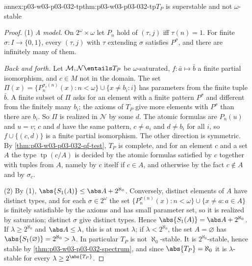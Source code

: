 \begin{annexitem}{annex:p03-w03-p03-032-tp}{thm:p03-w03-p03-032-tp}{\(T_P\) is superstable and not \(\omega\)-stable}
\begin{proof}
(1) \emph{A model.}  On \(2^\omega\times\omega\) let \(P_n\) hold of
\((\tau,j)\) iff \(\tau(n)=1\).  For finite \(\sigma:I\to\{0,1\}\), every
\((\tau,j)\) with \(\tau\) extending \(\sigma\) satisfies \(P^\sigma\), and
there are infinitely many of them.

\emph{Back and forth.}  Let \(\mathcal M,\mathcal N\entails T_P\) be
\(\omega\)-saturated, \(f:\bar a\mapsto\bar b\) a finite partial isomorphism,
and \(c\in M\) not in the domain.  The set
\(\Pi(x)=\{P_n^{\sigma_c(n)}(x):n<\omega\}\cup\{x\neq b_i:i\}\) has
parameters from the finite tuple \(\bar b\).  A finite subset of \(\Pi\)
asks for an element with a finite pattern \(P^\sigma\) and different from the
finitely many \(b_i\); the axioms of \(T_P\) give more elements with
\(P^\sigma\) than there are \(b_i\).  So \(\Pi\) is realized in
\(\mathcal N\) by some \(d\).  The atomic formulas are \(P_n(u)\) and
\(u=v\); \(c\) and \(d\) have the same pattern, \(c\neq a_i\) and
\(d\neq b_i\) for all \(i\), so \(f\cup\{(c,d)\}\) is a finite partial
isomorphism.  The other direction is symmetric.  By
\cref{thm:p03-w03-p03-032-qf-test}, \(T_P\) is complete, and for an element
\(c\) and a set \(A\) the type \(\operatorname{tp}(c/A)\) is decided by the
atomic formulas satisfied by \(c\) together with tuples from \(A\), namely by
\(c\) itself if \(c\in A\), and otherwise by the fact \(c\notin A\) and by
\(\sigma_c\).

(2) By (1), \(\abs{S_1(A)}\leq\abs A+2^{\aleph_0}\).  Conversely, distinct
elements of \(A\) have distinct types, and for each \(\sigma\in2^\omega\) the
set \(\{P_n^{\sigma(n)}(x):n<\omega\}\cup\{x\neq a:a\in A\}\) is finitely
satisfiable by the axioms and has small parameter set, so it is realized by
saturation; distinct \(\sigma\) give distinct types.  Hence
\(\abs{S_1(A)}=\abs A+2^{\aleph_0}\).  If \(\lambda\geq2^{\aleph_0}\) and
\(\abs A\leq\lambda\), this is at most \(\lambda\); if
\(\lambda<2^{\aleph_0}\), the set \(A=\varnothing\) has
\(\abs{S_1(\varnothing)}=2^{\aleph_0}>\lambda\).  In particular \(T_P\) is
not \(\aleph_0\)-stable.  It is \(2^{\aleph_0}\)-stable, hence stable by
\cref{thm:p03-w03-p03-032-spectrum}, and since \(\abs{T_P}=\aleph_0\) it is
\(\lambda\)-stable for every \(\lambda\geq2^{\abs{T_P}}\).


\end{proof}
\end{annexitem}
